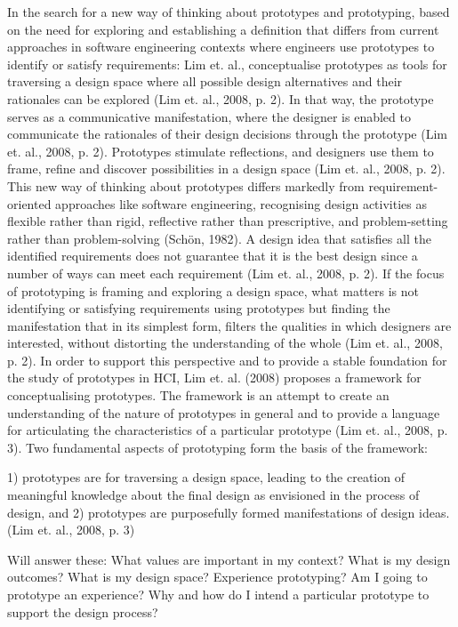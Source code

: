 In the search for a new way of thinking about prototypes and prototyping, based on the need for exploring and establishing a definition that differs from current approaches in software engineering contexts where engineers use prototypes to identify or satisfy requirements: Lim et. al., conceptualise prototypes as tools for traversing a design space where all possible design alternatives and their rationales can be explored (Lim et. al., 2008, p. 2). In that way, the prototype serves as a communicative manifestation, where the designer is enabled to communicate the rationales of their design decisions through the prototype (Lim et. al., 2008, p. 2). Prototypes stimulate reflections, and designers use them to frame, refine and discover possibilities in a design space (Lim et. al., 2008, p. 2). This new way of thinking about prototypes differs markedly from requirement-oriented approaches like software engineering, recognising design activities as flexible rather than rigid, reflective rather than prescriptive, and problem-setting rather than problem-solving (Schön, 1982). A design idea that satisfies all the identified requirements does not guarantee that it is the best design since a number of ways can meet each requirement (Lim et. al., 2008, p. 2). If the focus of prototyping is framing and exploring a design space, what matters is not identifying or satisfying requirements using prototypes but finding the manifestation that in its simplest form, filters the qualities in which designers are interested, without distorting the understanding of the whole (Lim et. al., 2008, p. 2). In order to support this perspective and to provide a stable foundation for the study of prototypes in HCI, Lim et. al. (2008) proposes a framework for conceptualising prototypes. The framework is an attempt to create an understanding of the nature of prototypes in general and to provide a language for articulating the characteristics of a particular prototype (Lim et. al., 2008, p. 3). Two fundamental aspects of prototyping form the basis of the framework:

1) prototypes are for traversing a design space, leading to the creation of meaningful knowledge about the final design as envisioned in the process of design, and
2) prototypes are purposefully formed manifestations of design ideas.
(Lim et. al., 2008, p. 3)

Will answer these:
What values are important in my context?
What is my design outcomes?
What is my design space?
Experience prototyping? Am I going to prototype an experience?
Why and how do I intend a particular prototype to support the design process?
